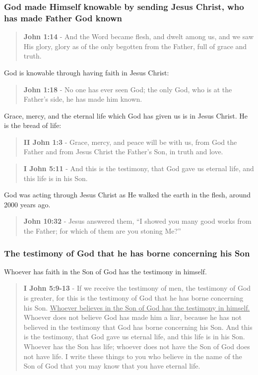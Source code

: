 \documentclass[11pt]{article}
\begin{document}
\subsubsection{God made Himself knowable by sending Jesus Christ, who has made Father God known}
\label{sec:org5595cc7}

\begin{quote}
\textbf{John 1:14} - And the Word became flesh, and dwelt among us, and we saw His glory, glory as of the only begotten from the Father, full of grace and truth.
\end{quote}

God is knowable through having faith in Jesus Christ:

\begin{quote}
\textbf{John 1:18} - No one has ever seen God; the only God, who is at the Father's side, he has made him known.
\end{quote}

Grace, mercy, and the eternal life which God has given us is in Jesus Christ. He is the bread of life:

\begin{quote}
\textbf{II John 1:3} - Grace, mercy, and peace will be with us, from God the Father and from Jesus Christ the Father's Son, in truth and love.
\end{quote}

\begin{quote}
\textbf{I John 5:11} - And this is the testimony, that God gave us eternal life, and this life is in his Son.
\end{quote}

God was acting through Jesus Christ as He walked the earth in the flesh, around 2000 years ago.

\begin{quote}
\textbf{John 10:32} - Jesus answered them, “I showed you many good works from the Father; for which of them are you stoning Me?”
\end{quote}

\subsubsection{The testimony of God that he has borne concerning his Son}
\label{sec:orgeb24427}
Whoever has faith in the Son of God has the testimony in himself.

\begin{quote}
\textbf{I John 5:9-13} - If we receive the testimony of men, the testimony of God is greater, for this is the testimony of God that he has borne concerning his Son. \uline{Whoever believes in the Son of God has the testimony in himself.} Whoever does not believe God has made him a liar, because he has not believed in the testimony that God has borne concerning his Son. And this is the testimony, that God gave us eternal life, and this life is in his Son. Whoever has the Son has life; whoever does not have the Son of God does not have life. I write these things to you who believe in the name of the Son of God that you may know that you have eternal life.
\end{quote}
\end{document}
